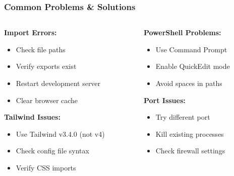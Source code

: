 \documentclass[aspectratio=169]{beamer}
\begin{document}
\begin{frame}
\frametitle{Common Problems \& Solutions}
\begin{columns}
\begin{column}{0.5\textwidth}
\textbf{Import Errors:}
\begin{itemize}
\item Check file paths
\item Verify exports exist
\item Restart development server
\item Clear browser cache
\end{itemize}

\textbf{Tailwind Issues:}
\begin{itemize}
\item Use Tailwind v3.4.0 (not v4)
\item Check config file syntax
\item Verify CSS imports
\end{itemize}
\end{column}
\begin{column}{0.5\textwidth}
\textbf{PowerShell Problems:}
\begin{itemize}
\item Use Command Prompt
\item Enable QuickEdit mode
\item Avoid spaces in paths
\end{itemize}

\textbf{Port Issues:}
\begin{itemize}
\item Try different port
\item Kill existing processes
\item Check firewall settings
\end{itemize}
\end{column}
\end{columns}
\end{frame}
\end{document}
